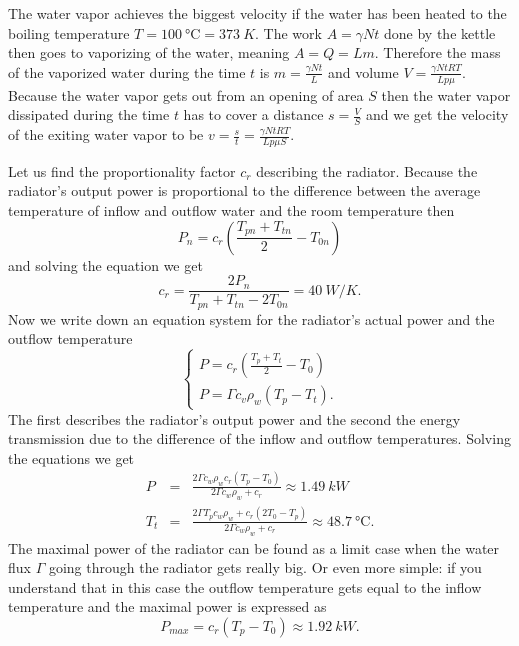\documentclass[11pt]{article}
\begin{document}

\solueng
The water vapor achieves the biggest velocity if the water has been heated to the boiling temperature $T=\SI{100}{\degreeCelsius}=\SI{373}{K}$. The work $A=\gamma Nt$ done by the kettle then goes to vaporizing of the water, meaning $A=Q=Lm$. Therefore the mass of the vaporized water during the time $t$ is $m=\frac{\gamma Nt}{L}$ and volume $V=\frac{\gamma NtRT}{Lp\mu}$. Because the water vapor gets out from an opening of area $S$ then the water vapor dissipated during the time $t$ has to cover a distance $s=\frac{V}{S}$ and we get the velocity of the exiting water vapor to be $v=\frac{s}{t}=\frac{\gamma NtRT}{Lp\mu S}$.
\probend
\bigskip


\solueng
Let us find the proportionality factor $c_{r}$ describing the radiator. Because the radiator’s output power is proportional to the difference between the average temperature of inflow and outflow water and the room temperature then
\[
P_{n}=c_{r}\left(\frac{T_{pn}+T_{tn}}{2}-T_{0n}\right)
\]
and solving the equation we get
\[
c_{r}=\frac{2P_{n}}{T_{pn}+T_{tn}-2T_{0n}}=\SI{40}{W/K}.
\]
Now we write down an equation system for the radiator’s actual power and the outflow temperature
\[
\left\{ \begin{array}{c}
P=c_{r}\left(\frac{T_{p}+T_{t}}{2}-T_{0}\right)\\
P=\Gamma c_{v}\rho_{w}\left(T_{p}-T_{t}\right).
\end{array}\right.
\]
The first describes the radiator’s output power and the second the energy transmission due to the difference of the inflow and outflow temperatures. Solving the equations we get
\begin{eqnarray*}
P & = & \frac{2\Gamma c_{w}\rho_{w}c_{r}\left(T_{p}-T_{0}\right)}{2\Gamma c_{w}\rho_{w}+c_{r}}\approx\SI{1.49}{kW}\\
T_{t} & = & \frac{2\Gamma T_{p}c_{w}\rho_{w}+c_{r}\left(2T_{0}-T_{p}\right)}{2\Gamma c_{w}\rho_{w}+c_{r}}\approx\SI{48.7}{\degreeCelsius}.
\end{eqnarray*}
The maximal power of the radiator can be found as a limit case when the water flux $\Gamma$ going through the radiator gets really big. Or even more simple: if you understand that in this case the outflow temperature gets equal to the inflow temperature and the maximal power is expressed as 
\[
P_{max}=c_{r}\left(T_{p}-T_{0}\right)\approx\SI{1.92}{kW}.
\]
\probend
\bigskip
\end{document}
